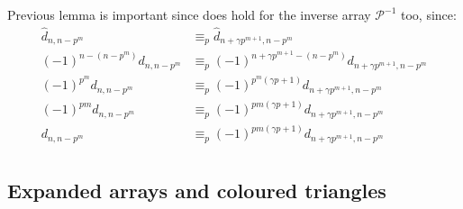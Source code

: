 \documentclass[10pt,a4paper]{article} %
\begin{document}
    Previous lemma is important since does hold for the inverse array $\mathcal{P}^{-1}$ too, since:
    \begin{displaymath}
        \begin{split}
            \hat{d}_{n,n-p^{m}} &\equiv_{p} \hat{d}_{n+\gamma p^{m+1}, n-p^{m}} \\
            (-1)^{n-(n-p^{m})}d_{n,n-p^{m}} &\equiv_{p} (-1)^{n+\gamma p^{m+1}-(n-p^{m})}d_{n+\gamma p^{m+1}, n-p^{m}} \\
            (-1)^{p^{m}}d_{n,n-p^{m}} &\equiv_{p} (-1)^{p^{m}(\gamma p+1)}d_{n+\gamma p^{m+1}, n-p^{m}} \\
            (-1)^{p{m}}d_{n,n-p^{m}} &\equiv_{p} (-1)^{p{m}(\gamma p+1)}d_{n+\gamma p^{m+1}, n-p^{m}} \\
            d_{n,n-p^{m}} &\equiv_{p} (-1)^{p{m}(\gamma p+1)}d_{n+\gamma p^{m+1}, n-p^{m}} \\
        \end{split}
    \end{displaymath}
    \subsection{Expanded arrays and coloured triangles}

    
    

    
    


    
    

\end{document}
